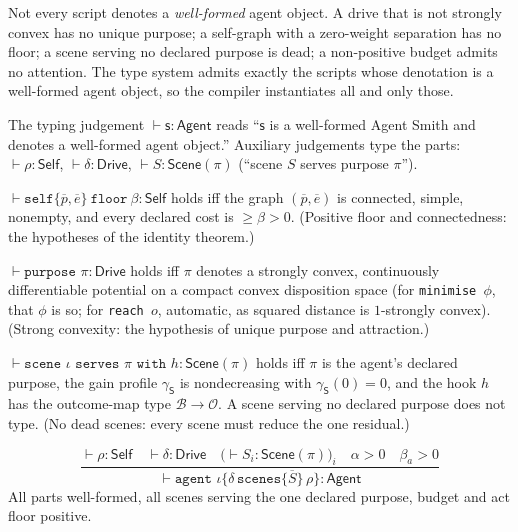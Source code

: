 \documentclass[11pt,twocolumn,a4paper]{article}
\newcommand{\floorc}{\beta}
\newcommand{\att}{\alpha}
\newcommand{\Scene}{\mathsf{S}}
\newcommand{\Out}{\mathcal{O}}
\newcommand{\spec}{\mathsf{s}}         %
\newcommand{\judge}{\vdash}
\begin{document}
Not every script denotes a \emph{well-formed} agent object. A drive that is
not strongly convex has no unique purpose; a self-graph with a zero-weight
separation has no floor; a scene serving no declared purpose is dead; a
non-positive budget admits no attention. The type system admits exactly the
scripts whose denotation is a well-formed agent object, so the compiler
instantiates all and only those.

\begin{definition}[Judgements]
\label{def:judgements}
The typing judgement $\judge\spec:\mathsf{Agent}$ reads ``$\spec$ is a
well-formed Agent Smith and denotes a well-formed agent object.'' Auxiliary
judgements type the parts: $\judge\rho:\mathsf{Self}$,
$\judge\delta:\mathsf{Drive}$, $\judge S:\mathsf{Scene}(\pi)$ (``scene $S$
serves purpose $\pi$'').
\end{definition}

\begin{trule}
\label{rule:self}
$\judge\texttt{self}\{\overline p,\overline e\}\ \texttt{floor}\ \floorc:
\mathsf{Self}$ holds iff the graph $(\overline p,\overline e)$ is connected,
simple, nonempty, and every declared cost is $\ge\floorc>0$. (Positive floor
and connectedness: the hypotheses of the identity theorem.)
\end{trule}

\begin{trule}
\label{rule:drive}
$\judge\texttt{purpose }\pi:\mathsf{Drive}$ holds iff $\pi$ denotes a strongly
convex, continuously differentiable potential on a compact convex disposition
space (for \texttt{minimise }$\phi$, that $\phi$ is so; for \texttt{reach
}$o$, automatic, as squared distance is $1$-strongly convex). (Strong
convexity: the hypothesis of unique purpose and attraction.)
\end{trule}

\begin{trule}
\label{rule:scene}
$\judge\texttt{scene }\iota\texttt{ serves }\pi\texttt{ with }h:
\mathsf{Scene}(\pi)$ holds iff $\pi$ is the agent's declared purpose, the gain
profile $\gamma_\Scene$ is nondecreasing with $\gamma_\Scene(0)=0$, and the
hook $h$ has the outcome-map type $\mathcal{B}\to\Out$. A scene serving no
declared purpose does not type. (No dead scenes: every scene must reduce the
one residual.)
\end{trule}

\begin{trule}
\label{rule:agent}
\[
\frac{\judge\rho:\mathsf{Self}\quad \judge\delta:\mathsf{Drive}\quad
      \bigl(\judge S_i:\mathsf{Scene}(\pi)\bigr)_i\quad \att>0\quad
      \floorc_a>0}
     {\judge\texttt{agent }\iota\{\delta\,\texttt{scenes}\{\overline S\}\,
      \rho\}:\mathsf{Agent}}
\]
All parts well-formed, all scenes serving the one declared purpose, budget and
act floor positive.
\end{trule}
\end{document}

